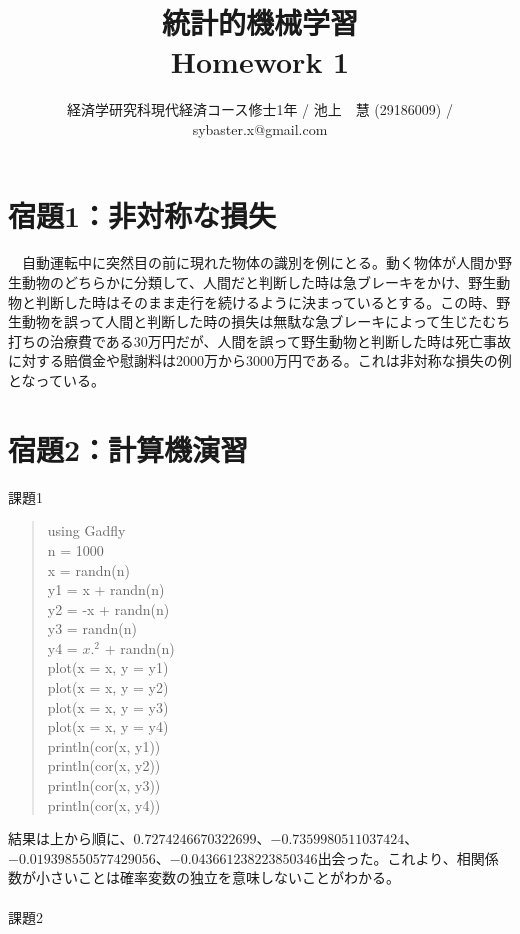 \documentclass{article}
\begin{document}
\title{統計的機械学習 \\ 
Homework 1}
\author{経済学研究科現代経済コース修士1年 / 池上　慧 (29186009) / sybaster.x@gmail.com}
\maketitle

\section{宿題1：非対称な損失}
　自動運転中に突然目の前に現れた物体の識別を例にとる。動く物体が人間か野生動物のどちらかに分類して、人間だと判断した時は急ブレーキをかけ、野生動物と判断した時はそのまま走行を続けるように決まっているとする。この時、野生動物を誤って人間と判断した時の損失は無駄な急ブレーキによって生じたむち打ちの治療費である30万円だが、人間を誤って野生動物と判断した時は死亡事故に対する賠償金や慰謝料は2000万から3000万円である。これは非対称な損失の例となっている。

\section{宿題2：計算機演習}
課題1
\begin{quotation}
    using Gadfly\\
    n = 1000\\
    x = randn(n)\\
    y1 = x + randn(n)\\
    y2 = -x + randn(n)\\
    y3 = randn(n)\\
    y4 = $x.^2$ + randn(n)\\
    plot(x = x, y = y1)\\
    plot(x = x, y = y2)\\
    plot(x = x, y = y3)\\
    plot(x = x, y = y4)\\
    println(cor(x, y1))\\
    println(cor(x, y2))\\
    println(cor(x, y3))\\
    println(cor(x, y4))
\end{quotation}
結果は上から順に、$0.7274246670322699$、$-0.7359980511037424$、$-0.019398550577429056$、$-0.043661238223850346$出会った。これより、相関係数が小さいことは確率変数の独立を意味しないことがわかる。
\\
\\
課題2
\end{document}
